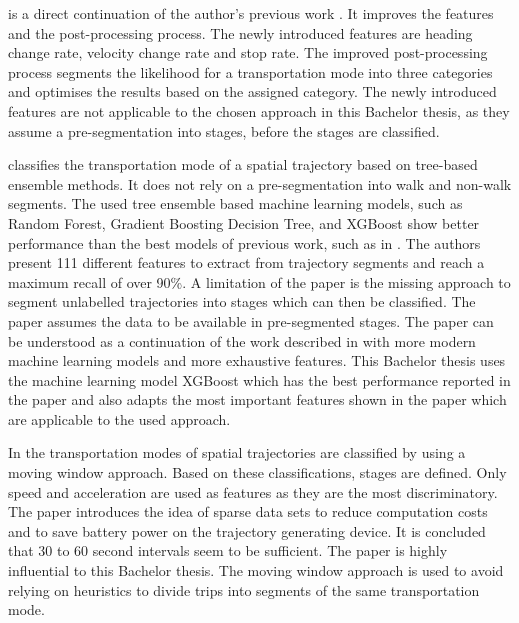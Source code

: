 \cite{zheng2008understanding} is a direct continuation of the author's previous work \cite{Zheng2008}. It improves the features and the post-processing process. The newly introduced features are heading change rate, velocity change rate and stop rate. The improved post-processing process segments the likelihood for a transportation mode into three categories and optimises the results based on the assigned category. \newline
The newly introduced features are not applicable to the chosen approach in this Bachelor thesis, as they assume a pre-segmentation into stages, before the stages are classified.

\cite{Xiao2017} classifies the transportation mode of a spatial trajectory based on tree-based ensemble methods. It does not rely on a pre-segmentation into walk and non-walk segments. The used tree ensemble based machine learning models, such as Random Forest, Gradient Boosting Decision Tree, and XGBoost show better performance than the best models of previous work, such as in \cite{Zheng2008}. The authors present 111 different features to extract from trajectory segments and reach a maximum recall of over 90\%. A limitation of the paper is the missing approach to segment unlabelled trajectories into stages which can then be classified. The paper assumes the data to be available in pre-segmented stages.\newline
The paper can be understood as a continuation of the work described in \cite{Zheng2008} with more modern machine learning models and more exhaustive features. This Bachelor thesis uses the machine learning model XGBoost which has the best performance reported in the paper and also adapts the most important features shown in the paper which are applicable to the used approach. \cite{chen2016xgboost}

In \cite{Bolbol2012} the transportation modes of spatial trajectories are classified by using a moving window approach. Based on these classifications, stages are defined. Only speed and acceleration are used as features as they are the most discriminatory. The paper introduces the idea of sparse data sets to reduce computation costs and to save battery power on the trajectory generating device. It is concluded that 30 to 60 second intervals seem to be sufficient.\newline
The paper is highly influential to this Bachelor thesis. The moving window approach is used to avoid relying on heuristics to divide trips into segments of the same transportation mode.


